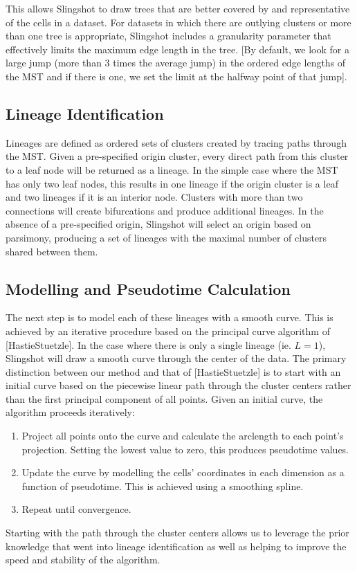 \documentclass[11pt]{article}\usepackage[]{graphicx}\usepackage[]{color}
\begin{document}
This allows Slingshot to draw trees that are better covered by and representative of the cells in a dataset. For datasets in which there are outlying clusters or more than one tree is appropriate, Slingshot includes a granularity parameter that effectively limits the maximum edge length in the tree. [By default, we look for a large jump (more than 3 times the average jump) in the ordered edge lengths of the MST and if there is one, we set the limit at the halfway point of that jump]. 

\subsection{Lineage Identification}
Lineages are defined as ordered sets of clusters created by tracing paths through the MST. Given a pre-specified origin cluster, every direct path from this cluster to a leaf node will be returned as a lineage. In the simple case where the MST has only two leaf nodes, this results in one lineage if the origin cluster is a leaf and two lineages if it is an interior node. Clusters with more than two connections will create bifurcations and produce additional lineages. In the absence of a pre-specified origin, Slingshot will select an origin based on parsimony, producing a set of lineages with the maximal number of clusters shared between them.

\subsection{Modelling and Pseudotime Calculation}
The next step is to model each of these lineages with a smooth curve. This is achieved by an iterative procedure based on the principal curve algorithm of [HastieStuetzle]. In the case where there is only a single lineage (ie. $L = 1$), Slingshot will draw a smooth curve through the center of the data. The primary distinction between our method and that of [HastieStuetzle] is to start with an initial curve based on the piecewise linear path through the cluster centers rather than the first principal component of all points. Given an initial curve, the algorithm proceeds iteratively:
\begin{enumerate}[font={\bfseries}]
\item Project all points onto the curve and calculate the arclength to each point's projection. Setting the lowest value to zero, this produces pseudotime values.
\item Update the curve by modelling the cells' coordinates in each dimension as a function of pseudotime. This is achieved using a smoothing spline.
\item Repeat until convergence.
\end{enumerate}
Starting with the path through the cluster centers allows us to leverage the prior knowledge that went into lineage identification as well as helping to improve the speed and stability of the algorithm.
\end{document}
